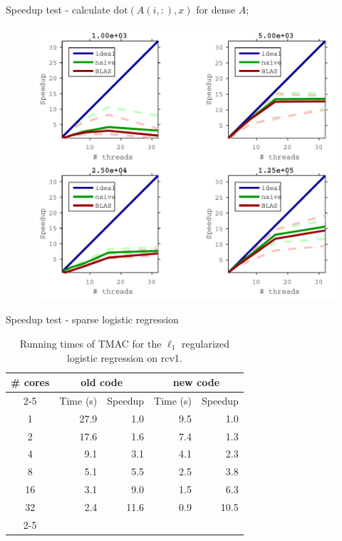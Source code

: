 \documentclass[hyperref,handout,compress,9pt,mathserif]{beamer}
\begin{document}
\begin{frame}{Speedup test - calculate $\text{dot}(A(i, :), x)$ for dense $A$;}
\begin{figure}[!h]
        \centering
                \includegraphics[width=.8\textwidth]{./figs/sp_mtx_ds_vec_speedup_cropped.pdf}
\end{figure}
\end{frame}




\begin{frame}{Speedup test - sparse logistic regression}
\begin{table}[htbp]
\centering
 {\small  \begin{tabular}{|c|r|r|r|r|}
  \hline
  \multirow{3}{*}{\# cores} & \multicolumn{2}{|c|}{old code} & \multicolumn{2}{c|}{new code} \\
  \cline{2-5}
  &Time (s) & Speedup & Time (s) & Speedup\\
  \hline
  1&27.9 & 1.0 & 9.5& 1.0\\
  2 &17.6& 1.6  &  7.4& 1.3\\
  4& 9.1& 3.1  & 4.1& 2.3\\
  8& 5.1 &5.5 & 2.5& 3.8\\
  16&3.1 &9.0 & 1.5&  6.3 \\
  32 &2.4 &11.6 & 0.9& 10.5\\
  \cline{2-5}
  \hline
  
  \hline
 \end{tabular} }
  \caption{\label{tab:log_time}Running times of  TMAC for the $\ell_1$ regularized logistic regression on rcv1.}
 \end{table}


\end{frame}
\end{document}
